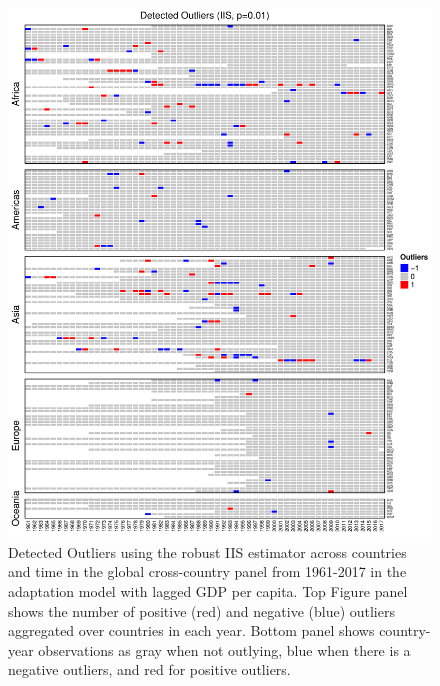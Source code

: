 \documentclass[11pt, letterpaper]{article}
\numberwithin{algorithm}{section}
\numberwithin{assumption}{section}
\numberwithin{lemma}{section}
\numberwithin{theorem}{section}
\numberwithin{corollary}{section}
\numberwithin{remark}{section}
\numberwithin{equation}{section}
\numberwithin{figure}{section}
\numberwithin{table}{section}
\begin{document}
\begin{figure}[!htbp]  \vspace{-.35in}
\centering
\includegraphics[width = \textwidth]{heat1_adapt.L1.pdf}
\caption{Detected Outliers using the robust IIS estimator across countries and time in the global cross-country panel from 1961-2017 in the adaptation model with lagged GDP per capita. Top Figure panel shows the number of positive (red) and negative (blue) outliers aggregated over countries in each year. Bottom panel shows country-year observations as gray when not outlying, blue when there is a negative outliers, and red for positive outliers.}
\label{fig_out_app2}
\end{figure}
\end{document}
